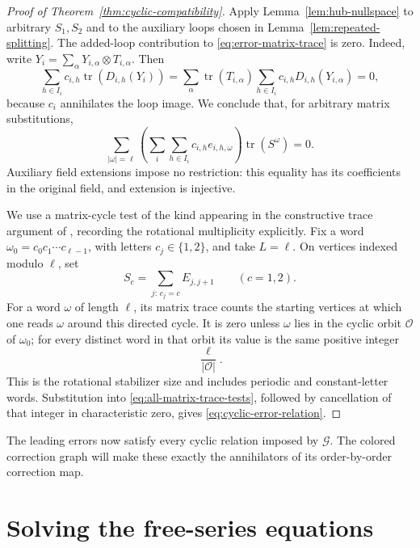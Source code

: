 \documentclass[11pt]{article}
\theoremstyle{definition}
\theoremstyle{remark}
\numberwithin{equation}{section}
\begin{document}
\begin{proof}[Proof of Theorem~\ref{thm:cyclic-compatibility}]
Apply Lemma~\ref{lem:hub-nullspace} to arbitrary \(S_1,S_2\)
and to the auxiliary loops chosen in
Lemma~\ref{lem:repeated-splitting}. The added-loop contribution
to \eqref{eq:error-matrix-trace} is zero. Indeed, write
\(Y_i=\sum_\alpha Y_{i,\alpha}\otimes T_{i,\alpha}\). Then
\[
 \sum_{h\in I_i}c_{i,h}\operatorname{tr}(D_{i,h}(Y_i))
 =\sum_\alpha\operatorname{tr}(T_{i,\alpha})
      \sum_{h\in I_i}c_{i,h}D_{i,h}(Y_{i,\alpha})=0,
\]
because \(c_i\) annihilates the loop image. We conclude that,
for arbitrary matrix substitutions,
\begin{equation}
 \sum_{|\omega|=\ell}
 \left(\sum_i\sum_{h\in I_i}c_{i,h}e_{i,h,\omega}\right)
 \operatorname{tr}(S^\omega)=0.
 \label{eq:all-matrix-trace-tests}
\end{equation}
Auxiliary field extensions impose no restriction: this equality
has its coefficients in the original field, and extension is
injective.

We use a matrix-cycle test of the kind appearing in the constructive
trace argument of \cite[Proposition~4.1]{KlepSpenko2014}, recording the
rotational multiplicity explicitly. Fix a word
\(\omega_0=c_0c_1\cdots c_{\ell-1}\), with letters
\(c_j\in\{1,2\}\), and take \(L=\ell\). On vertices indexed
modulo \(\ell\), set
\[
 S_c=\sum_{j:\,c_j=c}E_{j,j+1}\qquad(c=1,2).
\]
For a word \(\omega\) of length \(\ell\), its matrix trace
counts the starting vertices at which one reads \(\omega\)
around this directed cycle. It is zero unless \(\omega\) lies
in the cyclic orbit \(\mathcal O\) of \(\omega_0\); for every
distinct word in that orbit its value is the same positive integer
\[
 \frac{\ell}{|\mathcal O|}.
\]
This is the rotational stabilizer size and includes periodic and
constant-letter words. Substitution into
\eqref{eq:all-matrix-trace-tests}, followed by cancellation of that
integer in characteristic zero, gives
\eqref{eq:cyclic-error-relation}.
\end{proof}

The leading errors now satisfy every cyclic relation imposed by
\(\mathcal G\). The colored correction graph will make these
exactly the annihilators of its order-by-order correction map.

\section{Solving the free-series equations}
\label{sec:free-correction}
\end{document}
